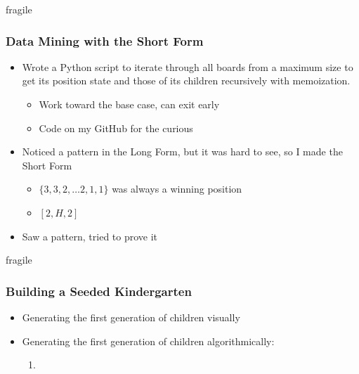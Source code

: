 \documentclass[aspectratio=169,usenames,dvipsnames]{beamer}
\begin{document}
\begin{frame}{fragile}
    \frametitle{Data Mining with the Short Form}
    
    \begin{itemize}
        \item Wrote a Python script to iterate through all boards from a maximum size to get its position state and those of its children recursively with memoization.
        \begin{itemize}
            \item Work toward the base case, can exit early
            \item Code on my GitHub for the curious
        \end{itemize}
        \item Noticed a pattern in the Long Form, but it was hard to see, so I made the Short Form
        \begin{itemize}
            \item $\texttt{\{}3, 3, 2, … 2, 1, 1\texttt{\}}$ was always a winning position
            \item $[2, H, 2]$
        \end{itemize}
        \item Saw a pattern, tried to prove it
    \end{itemize}
\end{frame}

\begin{frame}{fragile}
    \frametitle{Building a Seeded Kindergarten}
    \begin{itemize}
        \item Generating the first generation of children visually
        \item Generating the first generation of children algorithmically:
         \begin{enumerate}
             \item 
         \end{enumerate}
    \end{itemize}
\end{frame}
\end{document}
